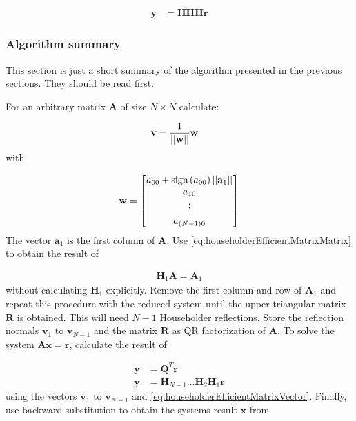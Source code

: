 \begin{align}
\mathbf{y} &= \mathbf{\bar{\bar{H}}}\mathbf{\bar{H}}\mathbf{H}\mathbf{r}
\end{align}
%




\subsubsection{Algorithm summary}

This section is just a short summary of the algorithm presented in the previous sections.
They should be read first.

For an arbitrary matrix $\mathbf{A}$ of size $N \times N$ calculate:

\begin{align}
\label{eq:qrReflectionUnitNormal}
\mathbf{v} 
&=
\frac{1}{\left\vert\left\vert\mathbf{w}\right\vert\right\vert}\mathbf{w}
\end{align}
%
with 

\begin{align}
\label{eq:qrReflectionNormal}
\mathbf{w} = 
\begin{bmatrix}
a_{00} + \textrm{sign}\left(a_{00}\right) \left\vert\left\vert\mathbf{a}_1\right\vert\right\vert\\
a_{10}\\
\vdots\\
a_{\left(N-1\right)0}
\end{bmatrix}
\end{align}
%
The vector $\mathbf{a}_1$ is the first column of $\mathbf{A}$. 
Use \cref{eq:householderEfficientMatrixMatrix} to obtain the result of

\begin{align}
\mathbf{H}_1 \mathbf{A} = \mathbf{A}_1
\end{align}
%
without calculating $\mathbf{H}_1$ explicitly.
Remove the first column and row of $\mathbf{A}_1$ and repeat this procedure with the reduced system until the upper triangular matrix $\mathbf{R}$ is obtained.
This will need $N-1$ Householder reflections.
Store the reflection normals $\mathbf{v}_1$ to $\mathbf{v}_{N-1}$ and the matrix $\mathbf{R}$ as QR factorization of $\mathbf{A}$.
To solve the system $\mathbf{A}\mathbf{x}=\mathbf{r}$, calculate the result of

\begin{align}
\mathbf{y} &= \mathbf{Q}^T\mathbf{r}\\
\mathbf{y} &= \mathbf{H}_{N-1} \hdots \mathbf{H}_{2}\mathbf{H}_{1}\mathbf{r}
\end{align}
%
using the vectors $\mathbf{v}_1$ to $\mathbf{v}_{N-1}$ and \cref{eq:householderEfficientMatrixVector}.
Finally, use backward substitution to obtain the systems result $\mathbf{x}$ from 

